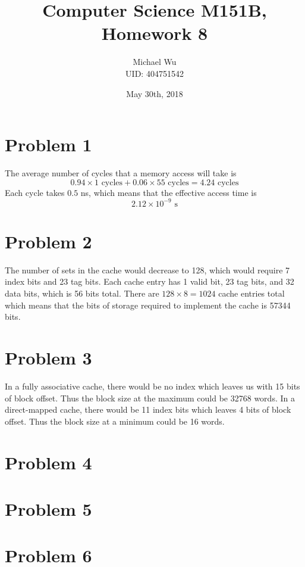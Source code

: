 \documentclass[12pt]{article}
\begin{document}
\title{Computer Science M151B, Homework 8}
\date{May 30th, 2018}
\author{Michael Wu\\UID: 404751542}
\maketitle

\section*{Problem 1}

The average number of cycles that a memory access will take is
\[0.94\times 1\text{ cycles} + 0.06\times 55\text{ cycles} = 4.24 \text{ cycles}\]
Each cycle takes \(0.5\) ns, which means that the effective access time is
\[2.12\times 10^{-9} \text{ s}\]

\section*{Problem 2}

The number of sets in the cache would decrease to 128, which would require 7 index bits and 23 tag bits.
Each cache entry has 1 valid bit, 23 tag bits, and 32 data bits, which is 56 bits total. There are \(128\times 8=1024\)
cache entries total which means that the bits of storage required to implement the cache is 57344 bits.

\section*{Problem 3}

In a fully associative cache, there would be no index which leaves us with 15 bits of block offset. Thus the block size at the maximum could
be 32768 words. In a direct-mapped cache, there would be 11 index bits which leaves 4 bits of block offset. Thus the block size at a minimum
could be 16 words.

\section*{Problem 4}

\section*{Problem 5}

\section*{Problem 6}
\end{document}
